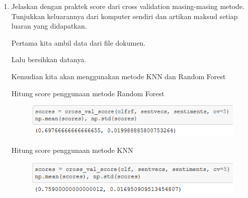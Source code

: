 \begin{enumerate}
	\item Jelaskan dengan praktek score dari cross validation masing-masing metode. Tunjukkan keluarannya dari komputer sendiri dan artikan maksud setiap luaran yang didapatkan.
	
	Pertama kita ambil data dari file dokumen.
	
	\hfill\break
	Lalu bersihkan datanya.
	
	\hfill\break
	Kemudian kita akan menggunakan metode KNN dan Random Forest
	
	Hitung score penggunaan metode Random Forest
	
	\begin{figure}[H]
		\centering
			\includegraphics[width=8 cm]{figures/1174006/chapter5/soalpraktek/rf.PNG}
		\end{figure}
	\hfill\break
	Hitung score penggunaan metode KNN
	
	\hfill\break
	\begin{figure}[H]
	\centering
		\includegraphics[width=8 cm]{figures/1174006/chapter5/soalpraktek/knn.PNG}
	\end{figure}
\end{enumerate}

